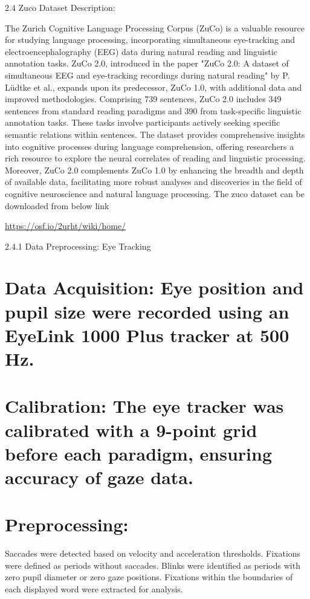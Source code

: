 \documentclass[11pt]{article}
\begin{document}
2.4 Zuco Dataset Description:
\begin{justify}
The Zurich Cognitive Language Processing Corpus (ZuCo) is a valuable resource for studying language processing, incorporating simultaneous eye-tracking and electroencephalography (EEG) data during natural reading and linguistic annotation tasks. ZuCo 2.0, introduced in the paper "ZuCo 2.0: A dataset of simultaneous EEG and eye-tracking recordings during natural reading" by P. Lüdtke et al., expands upon its predecessor, ZuCo 1.0, with additional data and improved methodologies. Comprising 739 sentences, ZuCo 2.0 includes 349 sentences from standard reading paradigms and 390 from task-specific linguistic annotation tasks. These tasks involve participants actively seeking specific semantic relations within sentences. The dataset provides comprehensive insights into cognitive processes during language comprehension, offering researchers a rich resource to explore the neural correlates of reading and linguistic processing. Moreover, ZuCo 2.0 complements ZuCo 1.0 by enhancing the breadth and depth of available data, facilitating more robust analyses and discoveries in the field of cognitive neuroscience and natural language processing. The zuco dataset can be downloaded from below link 
\end{justify}
\url{https://osf.io/2urht/wiki/home/}

2.4.1 Data Preprocessing: Eye Tracking

\section{Data Acquisition: Eye position and pupil size were recorded using an EyeLink 1000 Plus tracker at 500 Hz.}
\label{sec:org0b190b2}
\section{Calibration: The eye tracker was calibrated with a 9-point grid before each paradigm, ensuring accuracy of gaze data.}
\label{sec:orge0bc316}
\section{Preprocessing:}
\label{sec:org789d466}
Saccades were detected based on velocity and acceleration thresholds.
Fixations were defined as periods without saccades.
Blinks were identified as periods with zero pupil diameter or zero gaze positions.
Fixations within the boundaries of each displayed word were extracted for analysis.
\end{document}
